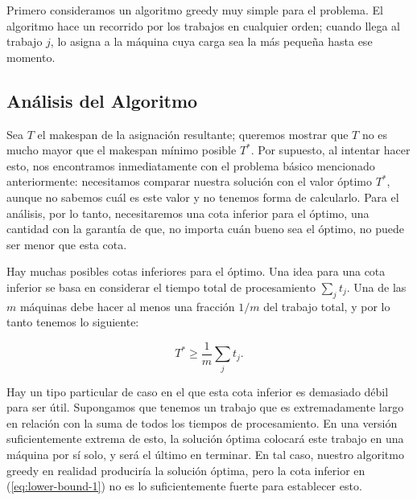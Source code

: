 \documentclass{report}
\begin{document}
	Primero consideramos un algoritmo greedy muy simple para el problema. El algoritmo hace un recorrido por los trabajos en cualquier orden; cuando llega al trabajo \( j \), lo asigna a la máquina cuya carga sea la más pequeña hasta ese momento.
	

		

	
	\subsection*{Análisis del Algoritmo}
	
	Sea \( T \) el makespan de la asignación resultante; queremos mostrar que \( T \) no es mucho mayor que el makespan mínimo posible \( T^* \). Por supuesto, al intentar hacer esto, nos encontramos inmediatamente con el problema básico mencionado anteriormente: necesitamos comparar nuestra solución con el valor óptimo \( T^* \), aunque no sabemos cuál es este valor y no tenemos forma de calcularlo. Para el análisis, por lo tanto, necesitaremos una cota inferior para el óptimo, una cantidad con la garantía de que, no importa cuán bueno sea el óptimo, no puede ser menor que esta cota.
	
	Hay muchas posibles cotas inferiores para el óptimo. Una idea para una cota inferior se basa en considerar el tiempo total de procesamiento \( \sum_j t_j \). Una de las \( m \) máquinas debe hacer al menos una fracción \( 1/m \) del trabajo total, y por lo tanto tenemos lo siguiente:
	
	\begin{equation} \label{eq:lower-bound-1}
		T^* \geq \frac{1}{m} \sum_j t_j.
	\end{equation}
	
	Hay un tipo particular de caso en el que esta cota inferior es demasiado débil para ser útil. Supongamos que tenemos un trabajo que es extremadamente largo en relación con la suma de todos los tiempos de procesamiento. En una versión suficientemente extrema de esto, la solución óptima colocará este trabajo en una máquina por sí solo, y será el último en terminar. En tal caso, nuestro algoritmo greedy en realidad produciría la solución óptima, pero la cota inferior en (\ref{eq:lower-bound-1}) no es lo suficientemente fuerte para establecer esto.
	
\end{document}
